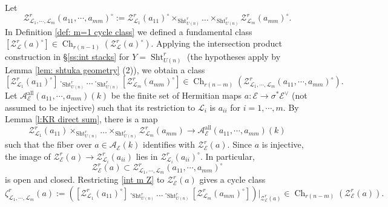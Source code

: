 \documentclass[reqno]{amsart}
\numberwithin{equation}{section}
\newcommand\mnote[1]{\marginpar{\tiny #1}}
\newcommand{\Cal}[1]{\mathcal{#1}}
\DeclareMathOperator{\Sht}{Sht}
\DeclareMathOperator{\Ch}{Ch}
\DeclareMathOperator{\all}{all}
\newcommand{\s}{\sigma}
\newcommand{\z}{\zeta}
\newcommand\cA{\mathcal{A}}
\newcommand\cE{\mathcal{E}}
\newcommand\cL{\mathcal{L}}
\newcommand\cZ{\mathcal{Z}}
\theoremstyle{remark}
\numberwithin{equation}{section}
\begin{document}
Let 
\begin{equation}
\cZ^{r}_{\cL_{1},\cdots, \cL_{m}}(a_{11},\cdots, a_{mm})^{\circ}:=\Cal{Z}^{r}_{\Cal{L}_1}(a_{11})^{\circ} \times_{\Sht^{r}_{U(n)}} \ldots \times_{\Sht^{r}_{U(n)}} \Cal{Z}^{r}_{\Cal{L}_m}(a_{mm})^{\circ}.
\end{equation}
In Definition \ref{def: m=1 cycle class} we defined a fundamental class $[\Cal{Z}_{\Cal{L}}^{r}(a)^{\circ}] \in \Ch_{r(n-1)}(\Cal{Z}_{\Cal{L}}^{r}(a)^{\circ})$. Applying the intersection product construction in \S\ref{ss:int stacks} for $Y=\Sht^{r}_{U(n)}$ (the hypotheses apply by Lemma \ref{lem: shtuka geometry} (2)), we obtain a class  %
\begin{equation}\label{int m Z}
[\Cal{Z}^r_{\Cal{L}_1}(a_{11})^{\circ}] \cdot_{\Sht_{U(n)}^r} \ldots \cdot_{\Sht_{U(n)}^r} [\Cal{Z}^{r}_{\Cal{L}_m}(a_{mm})^{\circ}]\in\Ch_{r(n-m)}(\Cal{Z}^{r}_{\Cal{L}_1,\cdots, \cL_{m}}(a_{11},\cdots, a_{mm})^{\circ}).
\end{equation}
Let $\cA_{\cE}^{\all}(a_{11},\cdots, a_{mm})(k)$ be the finite set of Hermitian maps $a:\cE\to \s^{*}\cE^{\vee}$ (not assumed to be injective) such that its restriction to $\cL_{i}$ is $a_{ii}$ for $i=1,\cdots, m$. By Lemma \ref{l:KR direct sum}, there is a map
\begin{equation}
\Cal{Z}_{\Cal{L}_1}^r(a_{11}) \times_{\Sht^{r}_{U(n)}} \ldots \times_{\Sht^{r}_{U(n)}} \Cal{Z}^r_{\Cal{L}_m}(a_{mm})\to \cA_{\cE}^{\all}(a_{11},\cdots, a_{mm})(k)
\end{equation}
such that the fiber over $a \in \cA_{\cE}(k)$ identifies with $\cZ^{r}_{\cE}(a)$. Since $a$ is injective, the image of $\cZ^{r}_{\cE}(a)\to \cZ^{r}_{\cL_{i}}(a_{ii})$ lies in $\cZ^{r}_{\cL_{i}}(a_{ii})^{\circ}$. In particular, 
\begin{equation}
\cZ^{r}_{\cE}(a)\subset \Cal{Z}^{r}_{\Cal{L}_1,\cdots,\Cal{L}_m}(a_{11}, \cdots, a_{mm})^{\circ}
\end{equation}
is open and closed. Restricting \eqref{int m Z} to $\cZ^{r}_{\cE}(a)$ gives a cycle class
\[
\z^{r}_{\cL_{1},\cdots, \cL_{m}}(a):=  \left([\Cal{Z}^r_{\Cal{L}_1}(a_{11})^{\circ}] \cdot_{\Sht_{U(n)}^r} \ldots \cdot_{\Sht_{U(n)}^r} [\Cal{Z}^{r}_{\Cal{L}_m}(a_{mm})^{\circ}]\right)  |_{\cZ^{r}_{\cE}(a)}
 \in  \Ch_{r(n-m)}(\cZ^{r}_{\cE}(a)).
\]
\end{document}
